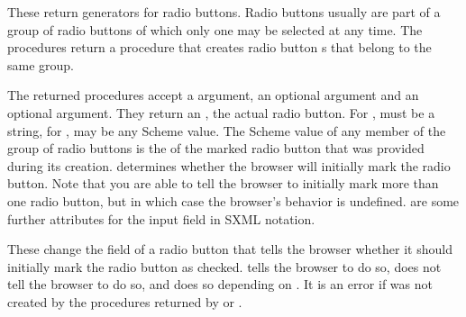 \begin{desc}
  These return generators for radio buttons.  Radio buttons usually
  are part of a group of radio buttons of which only one may be
  selected at any time.  The procedures return a procedure that
  creates radio button s that belong to the same
  group.  

  The returned procedures accept a  argument, an optional
   argument and an optional  argument.
  They return an , the actual radio button.  For
  ,  must be a string, for
  ,  may be any Scheme
  value.  The Scheme value of any member of the group of radio buttons
  is the  of the marked radio button that was provided
  during its creation.   determines whether the browser
  will initially mark the radio button.  Note that you are able to
  tell the browser to initially mark more than one radio button, but
  in which case the browser's behavior is undefined.  
  are some further attributes for the input field in SXML notation.


\end{desc}

\begin{desc}
  These change the  field of a radio button that tells
  the browser whether it should initially mark the radio button as
  checked.   tells the browser to do so,
   does not tell the browser to do so, and
   does so depending on .  It is
  an error if  was not created by the procedures
  returned by  or
  .
\end{desc}

